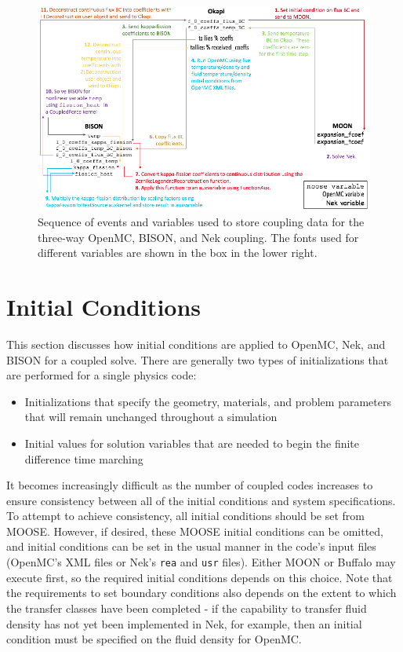 \documentclass[10pt]{article}
\numberwithin{equation}{section} %
\begin{document}
\begin{figure}[H]
\centering
\includegraphics[width=17.5cm]{figures/OpenMC-BISON-Nek-step1.png}
\caption{Sequence of events and variables used to store coupling data for the three-way OpenMC, BISON, and Nek coupling. The fonts used for different variables are shown in the box in the lower right.}
\end{figure}

\clearpage
\section{Initial Conditions}
\label{sec:ICs}
This section discusses how initial conditions are applied to OpenMC, Nek, and BISON for a coupled solve. There are generally two types of initializations that are performed for a single physics code:

\begin{itemize}
\item Initializations that specify the geometry, materials, and problem parameters that will remain unchanged throughout a simulation
\item Initial values for solution variables that are needed to begin the finite difference time marching
\end{itemize}

It becomes increasingly difficult as the number of coupled codes increases to ensure consistency between all of the initial conditions and system specifications. To attempt to achieve consistency, all initial conditions should be set from MOOSE. However, if desired, these MOOSE initial conditions can be omitted, and initial conditions can be set in the usual manner in the code's input files (OpenMC's XML files or Nek's {\tt rea} and {\tt usr} files). Either MOON or Buffalo may execute first, so the required initial conditions depends on this choice. Note that the requirements to set boundary conditions also depends on the extent to which the transfer classes have been completed - if the capability to transfer fluid density has not yet been implemented in Nek, for example, then an initial condition must be specified on the fluid density for OpenMC. 
\end{document}
